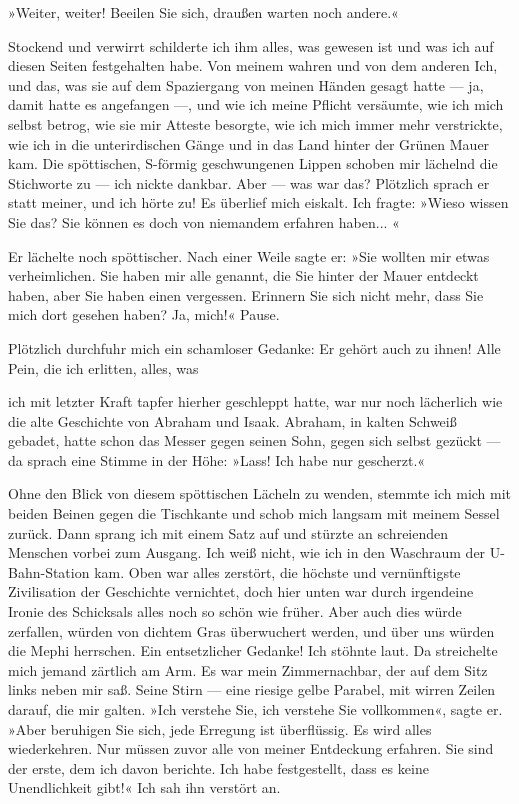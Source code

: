»Weiter, weiter! Beeilen Sie sich, draußen warten noch andere.«

Stockend und verwirrt schilderte ich ihm alles, was gewesen ist und
was ich auf diesen Seiten festgehalten habe. Von meinem wahren und
von dem anderen Ich, und das, was sie auf dem Spaziergang von
meinen Händen gesagt hatte — ja, damit hatte es angefangen —, und
wie ich meine Pflicht versäumte, wie ich mich selbst betrog, wie
sie mir Atteste besorgte, wie ich mich immer mehr verstrickte, wie
ich in die unterirdischen Gänge und in das Land hinter der Grünen
Mauer kam. Die spöttischen, S-förmig geschwungenen Lippen schoben
mir lächelnd die Stichworte zu — ich nickte dankbar. Aber — was war
das? Plötzlich sprach er statt meiner, und ich hörte zu! Es
überlief mich eiskalt. Ich fragte: »Wieso wissen Sie das? Sie
können es doch von niemandem erfahren haben... «

Er lächelte noch spöttischer. Nach einer Weile sagte er: »Sie
wollten mir etwas verheimlichen. Sie haben mir alle genannt, die
Sie hinter der Mauer entdeckt haben, aber Sie haben einen
vergessen. Erinnern Sie sich nicht mehr, dass Sie mich dort gesehen
haben? Ja, mich!« Pause.

Plötzlich durchfuhr mich ein schamloser Gedanke: Er gehört auch zu
ihnen! Alle Pein, die ich erlitten, alles, was

ich mit letzter Kraft tapfer hierher geschleppt hatte, war nur noch
lächerlich wie die alte Geschichte von Abraham und Isaak. Abraham,
in kalten Schweiß gebadet, hatte schon das Messer gegen seinen
Sohn, gegen sich selbst gezückt — da sprach eine Stimme in der
Höhe: »Lass! Ich habe nur gescherzt.«

Ohne den Blick von diesem spöttischen Lächeln zu wenden, stemmte
ich mich mit beiden Beinen gegen die Tischkante und schob mich
langsam mit meinem Sessel zurück. Dann sprang ich mit einem Satz
auf und stürzte an schreienden Menschen vorbei zum Ausgang. Ich
weiß nicht, wie ich in den Waschraum der U-Bahn-Station kam. Oben
war alles zerstört, die höchste und vernünftigste Zivilisation der
Geschichte vernichtet, doch hier unten war durch irgendeine Ironie
des Schicksals alles noch so schön wie früher. Aber auch dies würde
zerfallen, würden von dichtem Gras überwuchert werden, und über uns
würden die Mephi herrschen. Ein entsetzlicher Gedanke! Ich stöhnte
laut. Da streichelte mich jemand zärtlich am Arm. Es war mein
Zimmernachbar, der auf dem Sitz links neben mir saß. Seine Stirn —
eine riesige gelbe Parabel, mit wirren Zeilen darauf, die mir
galten. »Ich verstehe Sie, ich verstehe Sie vollkommen«, sagte er.
»Aber beruhigen Sie sich, jede Erregung ist überflüssig. Es wird
alles wiederkehren. Nur müssen zuvor alle von meiner Entdeckung
erfahren. Sie sind der erste, dem ich davon berichte. Ich habe
festgestellt, dass es keine Unendlichkeit gibt!« Ich sah ihn
verstört an.

